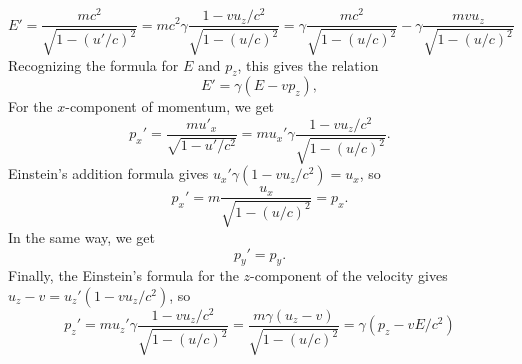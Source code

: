 \documentclass{article}
\begin{document}
        \begin{equation*}
            E' = \frac{mc^2}{\sqrt{1 - (u'/c)^2}} = mc^2 \gamma \frac{1 - v u_z/c^2}{\sqrt{1 - (u/c)^2}} =  \gamma \frac{mc^2}{\sqrt{1 - (u/c)^2}} - \gamma \frac{m v u_z}{\sqrt{1 - (u/c)^2}}
        \end{equation*}
        Recognizing the formula for $E$ and $p_z$, this gives the relation
        \begin{equation*}
            E' = \gamma(E - vp_z),
        \end{equation*}
        For the $x$-component of momentum, we get
        \begin{equation*}
            p_x'  =\frac{mu'_x}{\sqrt{1 - u'/c^2}} = m u_x' \gamma \frac{1 - v u_z/c^2}{\sqrt{1 - (u/c)^2}}.
        \end{equation*}
        Einstein's addition formula gives $u_x' \gamma(1 - v u_z/c^2) = u_x$, so
        \begin{equation*}
            p_x' = m \frac{u_x}{\sqrt{1 - (u/c)^2}} = p_x.
        \end{equation*}
        In the same way, we get 
        \begin{equation*}
            p_y' = p_y.
        \end{equation*}
        Finally, the Einstein's formula for the $z$-component of the velocity gives $u_z - v = u_z'(1 - v u_z/ c^2)$, so
        \begin{equation*}
            p_z' =  m u_z' \gamma \frac{1 - v u_z/c^2}{\sqrt{1 - (u/c)^2}} =\frac{m\gamma(u_z - v)}{\sqrt{1 - (u/c)^2}} = \gamma(p_z - vE/c^2)
        \end{equation*}
\end{document}
